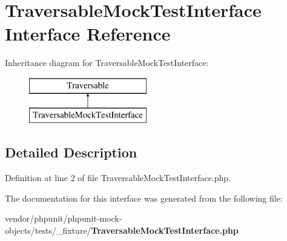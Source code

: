 \section{Traversable\+Mock\+Test\+Interface Interface Reference}
\label{interface_traversable_mock_test_interface}
Inheritance diagram for Traversable\+Mock\+Test\+Interface\+:\begin{figure}[H]
\begin{center}
\leavevmode
\includegraphics[height=2.000000cm]{interface_traversable_mock_test_interface}
\end{center}
\end{figure}


\subsection{Detailed Description}


Definition at line 2 of file Traversable\+Mock\+Test\+Interface.\+php.



The documentation for this interface was generated from the following file\+:\begin{DoxyCompactItemize}
\item 
vendor/phpunit/phpunit-\/mock-\/objects/tests/\+\_\+fixture/{\bf Traversable\+Mock\+Test\+Interface.\+php}\end{DoxyCompactItemize}
